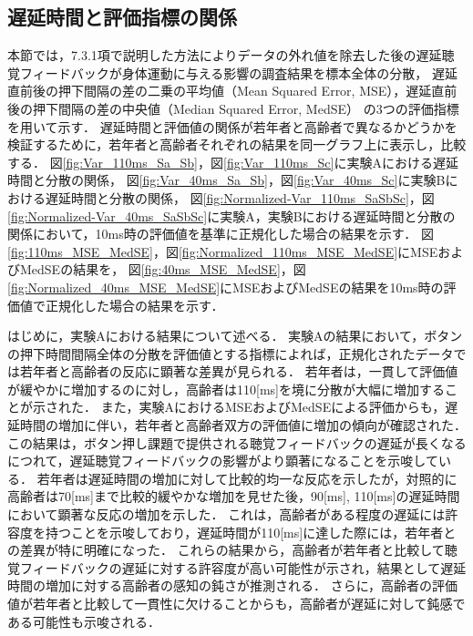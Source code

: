 \subsection{遅延時間と評価指標の関係}
本節では，7.3.1項で説明した方法によりデータの外れ値を除去した後の遅延聴覚フィードバックが身体運動に与える影響の調査結果を標本全体の分散，
遅延直前後の押下間隔の差の二乗の平均値（Mean Squared Error, MSE），遅延直前後の押下間隔の差の中央値（Median Squared Error, MedSE）
の3つの評価指標を用いて示す．
遅延時間と評価値の関係が若年者と高齢者で異なるかどうかを検証するために，若年者と高齢者それぞれの結果を同一グラフ上に表示し，比較する．
図\ref{fig:Var_110ms_Sa_Sb}，図\ref{fig:Var_110ms_Sc}に実験Aにおける遅延時間と分散の関係，
図\ref{fig:Var_40ms_Sa_Sb}，図\ref{fig:Var_40ms_Sc}に実験Bにおける遅延時間と分散の関係，
図\ref{fig:Normalized-Var_110ms_SaSbSc}，図\ref{fig:Normalized-Var_40ms_SaSbSc}に実験A，実験Bにおける遅延時間と分散の関係において，10ms時の評価値を基準に正規化した場合の結果を示す．
図\ref{fig:110ms_MSE_MedSE}，図\ref{fig:Normalized_110ms_MSE_MedSE}にMSEおよびMedSEの結果を，
図\ref{fig:40ms_MSE_MedSE}，図\ref{fig:Normalized_40ms_MSE_MedSE}にMSEおよびMedSEの結果を10ms時の評価値で正規化した場合の結果を示す．

はじめに，実験Aにおける結果について述べる．
実験Aの結果において，ボタンの押下時間間隔全体の分散を評価値とする指標によれば，正規化されたデータでは若年者と高齢者の反応に顕著な差異が見られる．
若年者は，一貫して評価値が緩やかに増加するのに対し，高齢者は110[ms]を境に分散が大幅に増加することが示された．
また，実験AにおけるMSEおよびMedSEによる評価からも，遅延時間の増加に伴い，若年者と高齢者双方の評価値に増加の傾向が確認された．
この結果は，ボタン押し課題で提供される聴覚フィードバックの遅延が長くなるにつれて，遅延聴覚フィードバックの影響がより顕著になることを示唆している．
若年者は遅延時間の増加に対して比較的均一な反応を示したが，対照的に高齢者は70[ms]まで比較的緩やかな増加を見せた後，90[ms], 110[ms]の遅延時間において顕著な反応の増加を示した．
これは，高齢者がある程度の遅延には許容度を持つことを示唆しており，遅延時間が110[ms]に達した際には，若年者との差異が特に明確になった．
これらの結果から，高齢者が若年者と比較して聴覚フィードバックの遅延に対する許容度が高い可能性が示され，結果として遅延時間の増加に対する高齢者の感知の鈍さが推測される．
さらに，高齢者の評価値が若年者と比較して一貫性に欠けることからも，高齢者が遅延に対して鈍感である可能性も示唆される．

